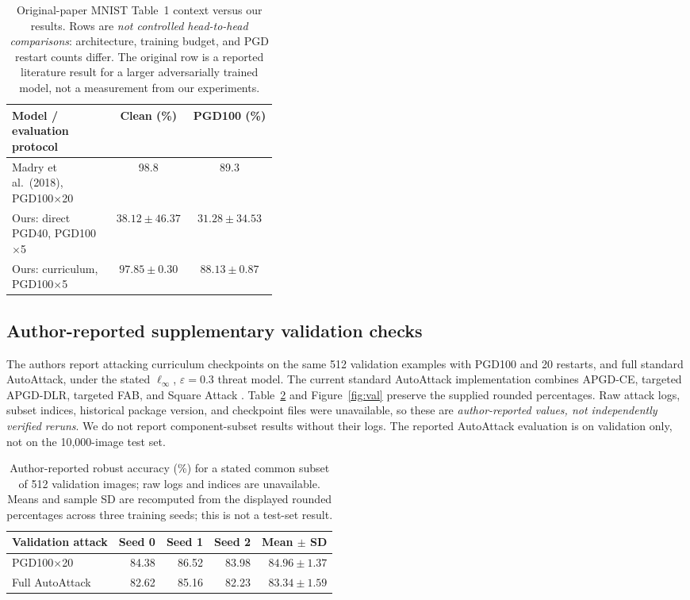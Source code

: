 \documentclass[11pt,a4paper]{article}
\newcommand{\linf}{\ell_\infty}
\begin{document}
\begin{table}[!htbp]
\centering
\caption{Original-paper MNIST Table~1 context versus our results. Rows are \emph{not controlled head-to-head comparisons}: architecture, training budget, and PGD restart counts differ. The original row is a reported literature result for a larger adversarially trained model, not a measurement from our experiments.}
\label{tab:paper}
\begin{tabular}{p{0.39\linewidth}cc}
\toprule
Model / evaluation protocol & Clean (\%) & PGD100 (\%) \\
\midrule
Madry et al.\ (2018), PGD100$\times$20 & 98.8 & 89.3 \\
Ours: direct PGD40, PGD100$\times$5 & $38.12\pm46.37$ & $31.28\pm34.53$ \\
Ours: curriculum, PGD100$\times$5 & $97.85\pm0.30$ & $88.13\pm0.87$ \\
\bottomrule
\end{tabular}
\end{table}

\FloatBarrier
\subsection{Author-reported supplementary validation checks}
The authors report attacking curriculum checkpoints on the same 512 validation examples with PGD100 and 20 restarts, and full standard AutoAttack, under the stated $\linf$, $\varepsilon=0.3$ threat model. The current standard AutoAttack implementation combines APGD-CE, targeted APGD-DLR, targeted FAB, and Square Attack \citep{croce2020reliable,autoattack_code}. Table~\ref{tab:val} and Figure~\ref{fig:val} preserve the supplied rounded percentages. Raw attack logs, subset indices, historical package version, and checkpoint files were unavailable, so these are \emph{author-reported values, not independently verified reruns}. We do not report component-subset results without their logs. The reported AutoAttack evaluation is on validation only, not on the 10,000-image test set.

\begin{table}[!htbp]
\centering
\caption{Author-reported robust accuracy (\%) for a stated common subset of 512 validation images; raw logs and indices are unavailable. Means and sample SD are recomputed from the displayed rounded percentages across three training seeds; this is not a test-set result.}
\label{tab:val}
\begin{tabular}{lrrrr}
\toprule
Validation attack & Seed 0 & Seed 1 & Seed 2 & Mean $\pm$ SD \\
\midrule
PGD100$\times$20 & 84.38 & 86.52 & 83.98 & $84.96\pm1.37$ \\
Full AutoAttack & 82.62 & 85.16 & 82.23 & $83.34\pm1.59$ \\
\bottomrule
\end{tabular}
\end{table}
\end{document}
